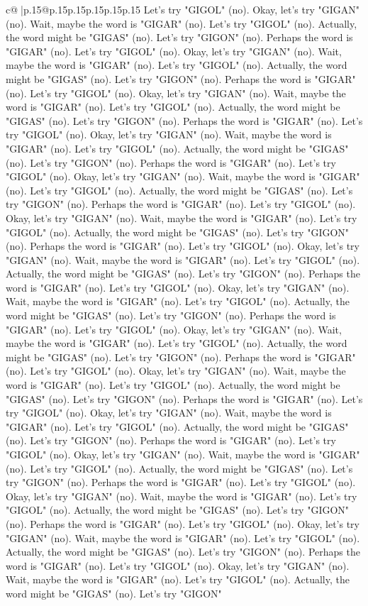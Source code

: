 \documentclass{article}
\begin{document}
{\begin{supertabular}{c@{$\;$}|p{.15\linewidth}@{}p{.15\linewidth}p{.15\linewidth}p{.15\linewidth}p{.15\linewidth}p{.15\linewidth}}
{{{Let's try "GIGOL" (no). Okay, let's try "GIGAN" (no). Wait, maybe the word is "GIGAR" (no). Let's try "GIGOL" (no). Actually, the word might be "GIGAS" (no). Let's try "GIGON" (no). Perhaps the word is "GIGAR" (no). Let's try "GIGOL" (no). Okay, let's try "GIGAN" (no). Wait, maybe the word is "GIGAR" (no). Let's try "GIGOL" (no). Actually, the word might be "GIGAS" (no). Let's try "GIGON" (no). Perhaps the word is "GIGAR" (no). Let's try "GIGOL" (no). Okay, let's try "GIGAN" (no). Wait, maybe the word is "GIGAR" (no). Let's try "GIGOL" (no). Actually, the word might be "GIGAS" (no). Let's try "GIGON" (no). Perhaps the word is "GIGAR" (no). Let's try "GIGOL" (no). Okay, let's try "GIGAN" (no). Wait, maybe the word is "GIGAR" (no). Let's try "GIGOL" (no). Actually, the word might be "GIGAS" (no). Let's try "GIGON" (no). Perhaps the word is "GIGAR" (no). Let's try "GIGOL" (no). Okay, let's try "GIGAN" (no). Wait, maybe the word is "GIGAR" (no). Let's try "GIGOL" (no). Actually, the word might be "GIGAS" (no). Let's try "GIGON" (no). Perhaps the word is "GIGAR" (no). Let's try "GIGOL" (no). Okay, let's try "GIGAN" (no). Wait, maybe the word is "GIGAR" (no). Let's try "GIGOL" (no). Actually, the word might be "GIGAS" (no). Let's try "GIGON" (no). Perhaps the word is "GIGAR" (no). Let's try "GIGOL" (no). Okay, let's try "GIGAN" (no). Wait, maybe the word is "GIGAR" (no). Let's try "GIGOL" (no). Actually, the word might be "GIGAS" (no). Let's try "GIGON" (no). Perhaps the word is "GIGAR" (no). Let's try "GIGOL" (no). Okay, let's try "GIGAN" (no). Wait, maybe the word is "GIGAR" (no). Let's try "GIGOL" (no). Actually, the word might be "GIGAS" (no). Let's try "GIGON" (no). Perhaps the word is "GIGAR" (no). Let's try "GIGOL" (no). Okay, let's try "GIGAN" (no). Wait, maybe the word is "GIGAR" (no). Let's try "GIGOL" (no). Actually, the word might be "GIGAS" (no). Let's try "GIGON" (no). Perhaps the word is "GIGAR" (no). Let's try "GIGOL" (no). Okay, let's try "GIGAN" (no). Wait, maybe the word is "GIGAR" (no). Let's try "GIGOL" (no). Actually, the word might be "GIGAS" (no). Let's try "GIGON" (no). Perhaps the word is "GIGAR" (no). Let's try "GIGOL" (no). Okay, let's try "GIGAN" (no). Wait, maybe the word is "GIGAR" (no). Let's try "GIGOL" (no). Actually, the word might be "GIGAS" (no). Let's try "GIGON" (no). Perhaps the word is "GIGAR" (no). Let's try "GIGOL" (no). Okay, let's try "GIGAN" (no). Wait, maybe the word is "GIGAR" (no). Let's try "GIGOL" (no). Actually, the word might be "GIGAS" (no). Let's try "GIGON" (no). Perhaps the word is "GIGAR" (no). Let's try "GIGOL" (no). Okay, let's try "GIGAN" (no). Wait, maybe the word is "GIGAR" (no). Let's try "GIGOL" (no). Actually, the word might be "GIGAS" (no). Let's try "GIGON" (no). Perhaps the word is "GIGAR" (no). Let's try "GIGOL" (no). Okay, let's try "GIGAN" (no). Wait, maybe the word is "GIGAR" (no). Let's try "GIGOL" (no). Actually, the word might be "GIGAS" (no). Let's try "GIGON" (no). Perhaps the word is "GIGAR" (no). Let's try "GIGOL" (no). Okay, let's try "GIGAN" (no). Wait, maybe the word is "GIGAR" (no). Let's try "GIGOL" (no). Actually, the word might be "GIGAS" (no). Let's try "GIGON" }}}
\end{supertabular}}
\end{document}
